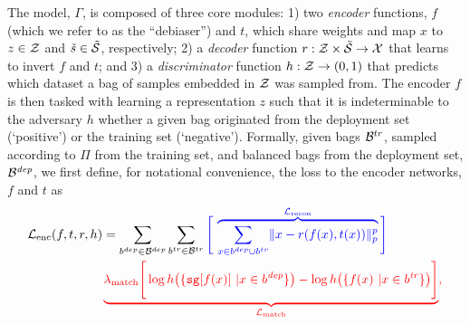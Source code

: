 The model, $\Gamma$, is composed of three core modules: 
1) two \emph{encoder} functions, $f$ (which we refer to
as the ``debiaser'') and $t$, which share weights and map $x$ to $z \in {\mathcal{Z}}$ and
$\tilde{s} \in \tilde{{\mathcal{S}}}$, respectively;
2) a \emph{decoder} function \(r: {\mathcal{Z}} \times \tilde{{\mathcal{S}}} \to {\mathcal{X}}\) that learns to
invert $f$ and $t$; and
3) a \emph{discriminator} function $h: {\mathcal{Z}} \to ( 0, 1 )$ that predicts which
dataset a bag of samples embedded in ${\mathcal{Z}}$ was sampled from. 
%
The encoder $f$ is then tasked with learning a representation $z$ such that it is indeterminable to
the adversary $h$ whether a given bag originated from the deployment set (`positive') or the
training set (`negative').
Formally, given bags
\( {\mathcal{B}}^{tr} \), sampled according to \(\Pi\) from the training set, and balanced bags from the deployment
set, \( {\mathcal{B}}^\mathit{dep} \), we first define, for notational convenience, the loss \wrt{} to the
encoder networks, $f$ and $t$ as
%
\begin{align}
&{\mathcal{L}}_\text{enc}(f, t, r, h) = 
  \sum_{b^{dep} \in {\mathcal{B}}^{dep}}
  \sum_{b^{tr} \in {\mathcal{B}}^{tr}} 
\textcolor{blue}{
  \Bigg[\,
    \overbrace{
    \sum_{x \in b^{dep} \cup b^{tr}} 
      \lVert x - r(f(x), t(x))\rVert_p^p}^{{\mathcal{L}}_{\text{recon}}}
    \Bigg]
    }
    \nonumber\\
   &\quad\quad\quad\quad\quad\quad
   \textcolor{red}{
     \underbrace{ \lambda_\text{match}  \Bigg[
       \log h \bigl( \{ \texttt{sg}[f(x)]\ | x \in b^\mathit{dep} \} \bigr) 
       - \log h \bigl( \{ f(x)\ | x \in b^\mathit{tr} \} \bigr) 
 \Bigg] }_{{\mathcal{L}}_{\text{match}}},
}
\label{eq:disentangling}
\end{align}
